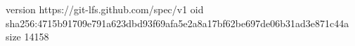 version https://git-lfs.github.com/spec/v1
oid sha256:4715b91709e791a623dbd93f69afa5e2a8a17bf62be697de06b31ad3e871c44a
size 14158
